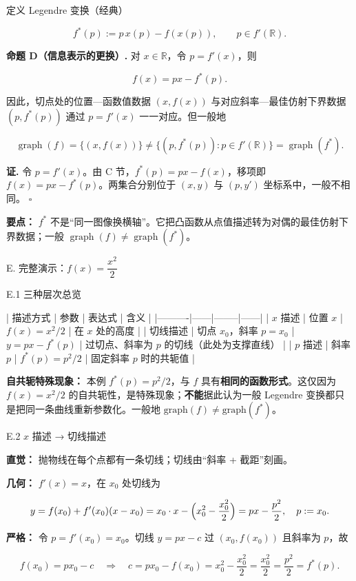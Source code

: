 \documentclass[
    lang=cn,
    color=blue,
    mode=fancy,
    thmcnt=section,
    scheme=chinese
]{elegantbook}
\begin{document}
定义 Legendre 变换（经典）

\[
f^*(p) := p\, x(p) - f(x(p)), \qquad p \in f'(\mathbb{R}).
\]

\textbf{命题 D（信息表示的更换）.} 对 $x \in \mathbb{R}$，令 $p = f'(x)$，则

\[
f(x) = p x - f^*(p).
\]

因此，切点处的位置—函数值数据 $(x, f(x))$ 与对应斜率—最佳仿射下界数据 $(p, f^*(p))$ 通过 $p = f'(x)$ 一一对应。但一般地

\[
\operatorname{graph}(f) = \{(x, f(x))\} \neq \{(p, f^*(p)) : p \in f'(\mathbb{R})\} = \operatorname{graph}(f^*).
\]

\textbf{证.} 令 $p = f'(x)$。由 C 节，$f^*(p) = px - f(x)$，移项即 $f(x) = px - f^*(p)$。两集合分别位于 $(x,y)$ 与 $(p,y')$ 坐标系中，一般不相同。 $\square$

\textbf{要点：} $f^*$ 不是“同一图像换横轴”。它把凸函数从点值描述转为对偶的最佳仿射下界数据；一般 $\operatorname{graph}(f)\neq\operatorname{graph}(f^*)$。

\par
E. 完整演示：$f(x) = \dfrac{x^2}{2}$

E.1 三种层次总览

| 描述方式 | 参数 | 表达式 | 含义 |
|----------|------|--------|------|
| $x$ 描述 | 位置 $x$ | $f(x) = x^2/2$ | 在 $x$ 处的高度 |
| 切线描述 | 切点 $x_0$，斜率 $p = x_0$ | $y = p x - f^*(p)$ | 过切点、斜率为 $p$ 的切线（此处为支撑直线） |
| $p$ 描述 | 斜率 $p$ | $f^*(p) = p^2/2$ | 固定斜率 $p$ 时的共轭值 |

\textbf{自共轭特殊现象：} 本例 $f^*(p) = p^2/2$，与 $f$ 具有\textbf{相同的函数形式}。这仅因为 $f(x)=x^2/2$ 的自共轭性，是特殊现象；\textbf{不能}据此认为一般 Legendre 变换都只是把同一条曲线重新参数化。一般地 $\mathrm{graph}(f) \neq \mathrm{graph}(f^*)$。

\par
E.2 $x$ 描述 → 切线描述

\textbf{直觉：} 抛物线在每个点都有一条切线；切线由“斜率 + 截距”刻画。

\textbf{几何：} $f'(x) = x$，在 $x_0$ 处切线为

\[
y = f(x_0) + f'(x_0)(x - x_0) = x_0 \cdot x - \Bigl(x_0^2 - \frac{x_0^2}{2}\Bigr) = p x - \frac{p^2}{2}, \quad p := x_0.
\]

\textbf{严格：} 令 $p = f'(x_0) = x_0$。切线 $y = px - c$ 过 $(x_0, f(x_0))$ 且斜率为 $p$，故

\[
f(x_0) = p x_0 - c \quad \Rightarrow \quad c = p x_0 - f(x_0) = x_0^2 - \frac{x_0^2}{2} = \frac{x_0^2}{2} = \frac{p^2}{2} = f^*(p).
\]
\end{document}
